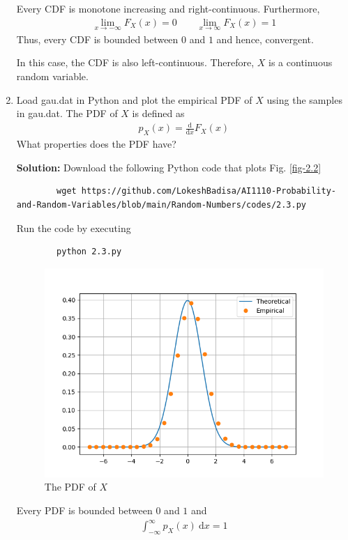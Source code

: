 \documentclass[journal,12pt,twocolumn]{IEEEtran}
\newcommand{\solution}{\noindent \textbf{Solution: }}
\providecommand{\der}[1]{\mathrm{d} #1}
\numberwithin{equation}{section}
\renewcommand\thesection{\arabic{section}}
\begin{document}
\begin{enumerate}[label=\thesection.\arabic*,ref=\thesection.\theenumi]
	Every CDF is monotone increasing and right-continuous. Furthermore,
	\begin{align}
		\lim_{x \to -\infty} F_{X}(x) = 0 \qquad \lim_{x \to \infty} F_{X}(x) = 1
	\end{align}
	Thus, every CDF is bounded between $0$ and $1$ and hence, convergent.
	
	In this case, the CDF is also left-continuous. Therefore, $X$ is a continuous random variable.
	
	\item Load gau.dat in Python and plot the empirical PDF of $X$ using the samples in gau.dat. The PDF of $X$ is defined as
	\begin{align}
		p_{X}(x) = \frac{\der{}}{\der{x}}F_{X}(x)
	\end{align}
	What properties does the PDF have?
	
	\solution Download the following Python code that plots Fig. \ref{fig-2.2}
	\begin{lstlisting}
		wget https://github.com/LokeshBadisa/AI1110-Probability-and-Random-Variables/blob/main/Random-Numbers/codes/2.3.py
	\end{lstlisting}
	Run the code by executing
	\begin{lstlisting}
		python 2.3.py
	\end{lstlisting}
	\begin{figure}
		\centering
		\includegraphics[width=\columnwidth]{./figs/2.3.png}
		\caption{The PDF of $X$}
		\label{fig-2.3}
	\end{figure}
	
	Every PDF is bounded between $0$ and $1$ and
	\begin{align}
		\int_{-\infty}^{\infty} p_{X}(x) ~\mathrm{d}x = 1
	\end{align}
	

\end{enumerate}
\end{document}
